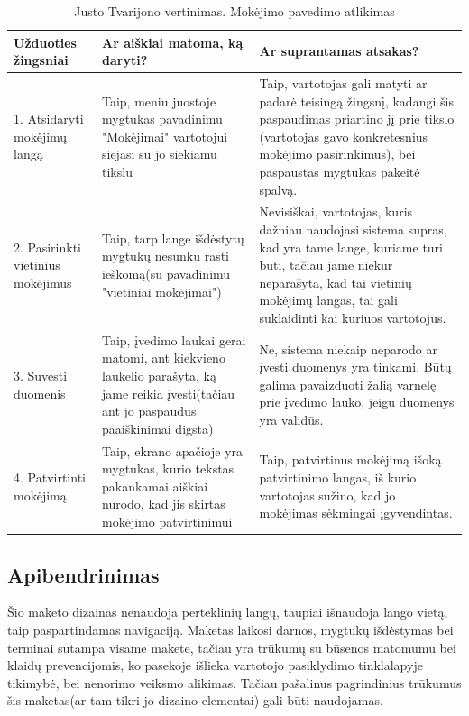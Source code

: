 \documentclass[oneside]{VUMIFPSkursinis}
\begin{document}
\begin{center}
\begin{longtable}[!htb]{|p{5cm}|p{5cm}|p{5cm}|}
	\caption{Justo Tvarijono vertinimas. Mokėjimo pavedimo atlikimas}
\endfirsthead
\endhead
	\hline
	Užduoties žingsniai & Ar aiškiai matoma, ką daryti? & Ar suprantamas atsakas? \\ \hline
	1. Atsidaryti mokėjimų langą & Taip, meniu juostoje mygtukas pavadinimu "Mokėjimai" vartotojui siejasi su jo siekiamu tikslu & Taip, vartotojas gali matyti ar padarė teisingą žingsnį, kadangi šis paspaudimas priartino jį prie tikslo (vartotojas gavo konkretesnius mokėjimo pasirinkimus), bei paspaustas mygtukas pakeitė spalvą. \\ \hline
	2. Pasirinkti vietinius mokėjimus & Taip, tarp lange išdėstytų mygtukų nesunku rasti ieškomą(su pavadinimu "vietiniai mokėjimai") & Nevisiškai, vartotojas, kuris dažniau naudojasi sistema supras, kad yra tame lange, kuriame turi būti, tačiau jame niekur neparašyta, kad tai vietinių mokėjimų langas, tai gali suklaidinti kai kuriuos vartotojus. \\ \hline
	3. Suvesti duomenis & Taip, įvedimo laukai gerai matomi, ant kiekvieno laukelio parašyta, ką jame reikia įvesti(tačiau ant jo paspaudus paaiškinimai digsta) & Ne, sistema niekaip neparodo ar įvesti duomenys yra tinkami. Būtų galima pavaizduoti žalią varnelę prie įvedimo lauko, jeigu duomenys yra validūs. \\ \hline
	4. Patvirtinti mokėjimą & Taip, ekrano apačioje yra mygtukas, kurio tekstas pakankamai aiškiai nurodo, kad jis skirtas mokėjimo patvirtinimui & Taip, patvirtinus mokėjimą išoką patvirtinimo langas, iš kurio vartotojas sužino, kad jo mokėjimas sėkmingai įgyvendintas. \\ \hline
\end{longtable}
\end{center}
\subsection{Apibendrinimas}
Šio maketo dizainas nenaudoja perteklinių langų, taupiai išnaudoja lango vietą, taip paspartindamas navigaciją. Maketas laikosi darnos, mygtukų išdėstymas bei terminai sutampa visame makete, tačiau yra trūkumų su būsenos matomumu bei klaidų prevencijomis, ko pasekoje išlieka vartotojo pasiklydimo tinklalapyje tikimybė, bei nenorimo veiksmo alikimas. Tačiau pašalinus pagrindinius trūkumus šis maketas(ar tam tikri jo dizaino elementai) gali būti naudojamas.
\end{document}
